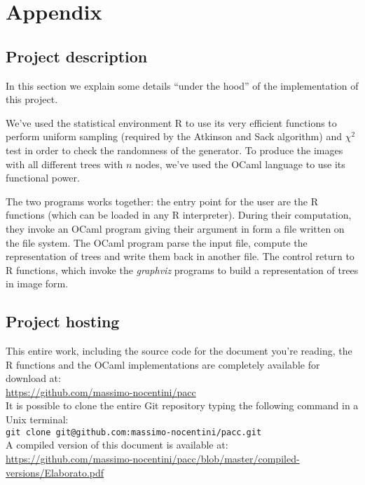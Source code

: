 \documentclass[twoside,openright,titlepage,fleqn,
	headinclude,11pt,a4paper,BCOR5mm,footinclude
	]{scrbook}
\begin{document}
\chapter{Appendix}
\label{chapter:appendix}

\section{Project description}

In this section we explain some details ``under the hood'' of the
implementation of this project.

We've used the statistical environment R to use its very efficient
functions to perform uniform sampling (required by the Atkinson and
Sack algorithm) and $\chi^2$ test in order to check the randomness of
the generator. To produce the images with all different trees with $n$
nodes, we've used the OCaml language to use its functional power.

The two programs works together: the entry point for the user are the
R functions (which can be loaded in any R interpreter). During their
computation, they invoke an OCaml program giving their argument in
form a file written on the file system. The OCaml program parse the
input file, compute the representation of trees and write them back in
another file. The control return to R functions, which invoke the
\emph{graphviz} programs to build a representation of trees in image
form.

\section{Project hosting}

This entire work, including the source code for the document you're
reading, the R functions and the OCaml implementations are completely
available for download at:\\
\href{https://github.com/massimo-nocentini/pacc}{https://github.com/massimo-nocentini/pacc}\\
It is possible to clone the entire Git repository typing the following
command in a Unix terminal:\\
\texttt{git clone git@github.com:massimo-nocentini/pacc.git}\\
A compiled version of this document is available at: \\
\href{https://github.com/massimo-nocentini/pacc/blob/master/compiled-versions/Elaborato.pdf}{https://github.com/massimo-nocentini/pacc/blob/master/compiled-versions/Elaborato.pdf}
\end{document}
